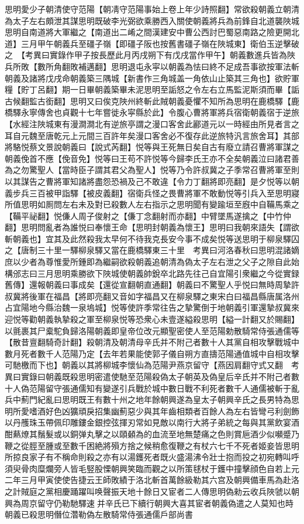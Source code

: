 思明愛少子朝清使守范陽【朝凊守范陽事始上卷上年少詩照翻】常欲殺朝義立朝清為太子左右頗泄其謀思明既破李光弼欲乘勝西入關使朝義將兵為前鋒自北道襲陜城思明自南道將大軍繼之【南道出二崤之間漢建安中曹公西討巴蜀惡南路之險更開北道】三月甲午朝義兵至礓子嶺【即礓子阪也按舊書礓子嶺在陜城東】衛伯玉逆擊破之　【考異曰實錄作甲子按長歷此月丙戌朔下有戊戌當作甲午】朝義數進兵皆為陜兵所敗【數所角翻敗補邁翻】思明退屯永寜以朝義為怯曰終不足成吾事欲按軍法斬朝義及諸將戊戌命朝義築三隅城【新書作三角城盖一角依山止築其三角也】欲貯軍糧【貯丁呂翻】期一日畢朝義築畢未泥思明至詬怒之令左右立馬監泥斯須而畢【詬古候翻監古銜翻】思明又曰俟克陜州終斬此賊朝義憂懼不知所為思明在鹿橋驛【鹿橋驛永寧傳舍也貞觀十七年嘗徙永寜縣於此】令腹心曹將軍將兵宿衛朝義宿于逆旅【水經注陜城東有漫澗澗北有逆旅亭謂之漫口客舍此酈道元以一時經由所見者言之耳自元魏至唐乾元上元間三百許年矣漫口客舍必不復存此逆旅特汎言旅舍耳】其部將駱悦蔡文景說朝義曰【說式芮翻】悦等與王死無日矣自古有廢立請召曹將軍謀之朝義俛首不應【俛音免】悦等曰王苟不許悦等今歸李氏王亦不全矣朝義泣曰諸君善為之勿驚聖人【當時臣子謂其君父為聖人】悦等乃令許叔冀之子季常召曹將軍至則以其謀告之曹將軍知諸將盡怨恐禍及己不敢違【令力丁翻將即亮翻】是夕悦等以朝義步兵三百被甲詣驛【被皮義翻】宿衛兵怪之畏曹將軍不敢動悦等引兵入至思明寢所值思明如厠問左右未及對已殺數人左右指示之思明聞有變踰垣至廐中自鞴馬乘之【鞴平祕翻】悦傔人周子俊射之【傔丁念翻射而亦翻】中臂墜馬遂擒之【中竹仲翻】思明問亂者為誰悦曰奉懷王命【思明封朝義為懷王】思明曰我朝來語失【謂欲斬朝義也】宜其及此然殺我太早何不待我克長安今事不成矣悦等送思明于柳泉驛囚之【唐制三十里一驛柳泉驛又當在鹿橋驛東三十里　考異曰河洛春秋曰思明混諸嫡庶以少者為尊惟愛所鍾即為繼嗣欲殺朝義追朝清為偽太子左右泄之父子之隙自此始構邠志曰三月思明乘勝欲下陜城使朝義帥銳卒北路先往己自宜陽引衆繼之今從實録舊傳】還報朝義曰事成矣【還從宣翻朝直通翻】朝義曰不驚聖人乎悦曰無時周摯許叔冀將後軍在福昌【將即亮翻又音如字福昌又在柳泉驛之東宋白曰福昌縣唐属洛州占宜陽地今縣治魏一泉塢城】悦等使許季常往告之摯驚倒于地朝義引軍還摯叔冀來迎悦等勸朝義執摯殺之軍至柳泉悦等恐衆心未壹遂縊殺思明【縊一計翻又於賜翻】以氈裹其尸槖駝負歸洛陽朝義即皇帝位改元顯聖密使人至范陽勅散騎常侍張通儒等【散昔亶翻騎奇計翻】殺朝清及朝清母辛氏并不附己者數十人其黨自相攻擊戰城中數月死者數千人范陽乃定【去年若果能使郭子儀自朔方直擣范陽通值城中自相攻擊可馳檄而下也】朝義以其將柳城李懷仙為范陽尹燕京留守【燕因肩翻守式又翻　考異曰實錄曰朝義既殺思明密遣使馳至范陽殺偽太子朝英及偽皇后辛氏并不附己者數十人偽范陽留守張通儒知有變遂引兵戰於城中數日戰不利死者數千人通儒被斬于亂兵中薊門紀亂曰思明既王有數十州之地年餘朝興遂為皇太子朝興辛氏之長男特為思明所愛嗜酒好色凶獷頑戾招集幽薊惡少與其年齒相類者百餘人為左右皆彎弓利劍飾以丹雘珠玉帶佩印雕鏤金銀控弦揮刃常如見敵以南行大將子弟統之每與其黨飲宴酒酣爇燎其鬚髮或以銅弹丸擊之以頤顙為的血流至地無楚痛之色則賞巵酒少似嚬蹙乃鞭之從脛至腫或至數千困絶將殞方捨之候稍愈復鞭之有杖六七千不死者姬妾皆思明所掠良家子有不稱命則殺之亦有以湯鑊死者既火盛湯沸令壯士抱而投之初宛轉叫呼須臾骨肉糜爛旁人皆毛竪股慄朝興笑臨而觀之以所策毬杖于鑊中撞擊顔色自若上元二年三月甲寅使使告捷云王師敗績于洛北斬首萬餘級勒其六宫及朝興備車馬為赴洛之計賊庭之黨相慶踊躍叫唤聲振天地十餘日又宦者二人傳思明偽勑云收兵陜虢以朝興為周京留守仍勒馳驛速并辛氏已下續行朝興大喜其宦者朝義偽遣之人莫知也時朝義已殺思明僭位濳勒偽左散騎常侍張通儒戶部尚書